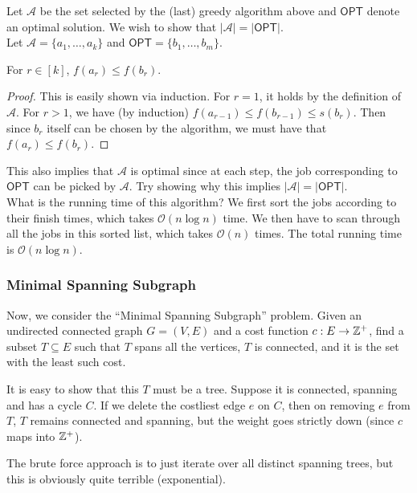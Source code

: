 Let $\mathcal{A}$ be the set selected by the (last) greedy algorithm above and $\mathsf{OPT}$ denote an optimal solution. We wish to show that $|\mathcal{A}|=|\mathsf{OPT}|$.\\
Let $\mathcal{A}=\{a_1,\ldots,a_k\}$ and $\mathsf{OPT}=\{b_1,\ldots,b_m\}$.

\begin{lemma}
For $r\in[k]$, $f(a_r) \leq f(b_r)$.
\end{lemma}
\begin{proof}
This is easily shown via induction. For $r=1$, it holds by the definition of $\mathcal{A}$. For $r>1$, we have (by induction) $f(a_{r-1}) \leq f(b_{r-1}) \leq s(b_r)$. Then since $b_r$ itself can be chosen by the algorithm, we must have that $f(a_r) \leq f(b_r)$.
\end{proof}

This also implies that $\mathcal{A}$ is optimal since at each step, the job corresponding to $\mathsf{OPT}$ can be picked by $\mathcal{A}$. Try showing why this implies $|\mathcal{A}|=|\mathsf{OPT}|$.\\
What is the running time of this algorithm? We first sort the jobs according to their finish times, which takes $\mathcal{O}(n\log n)$ time. We then have to scan through all the jobs in this sorted list, which takes $\mathcal{O}(n)$ times. The total running time is $\mathcal{O}(n\log n)$.

\subsubsection{Minimal Spanning Subgraph}

Now, we consider the ``Minimal Spanning Subgraph'' problem. Given an undirected connected graph $G=(V,E)$ and a cost function $c:E\to\mathbb{Z}^+$, find a subset $T\subseteq E$ such that $T$ spans all the vertices, $T$ is connected, and it is the set with the least such cost.

It is easy to show that this $T$ must be a tree. Suppose it is connected, spanning and has a cycle $C$. If we delete the costliest edge $e$ on $C$, then on removing $e$ from $T$, $T$ remains connected and spanning, but the weight goes strictly down (since $c$ maps into $\mathbb{Z}^+$).

The brute force approach is to just iterate over all distinct spanning trees, but this is obviously quite terrible (exponential).


